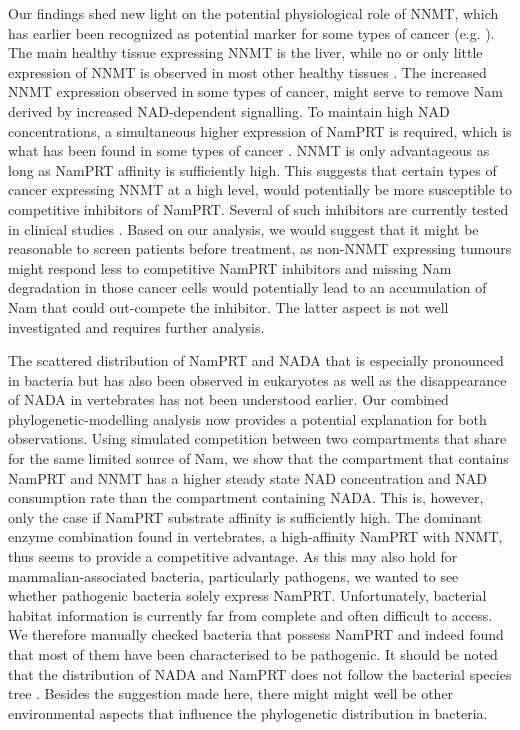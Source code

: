 Our findings shed new light on the potential physiological role of NNMT, which has earlier been recognized as potential marker for some types of cancer (e.g. \cite{Okamura1998}). The main healthy tissue expressing NNMT is the liver, while no or only little expression of NNMT is observed in most other healthy tissues . The increased NNMT expression observed in some types of cancer, might serve to remove Nam derived by increased NAD-dependent signalling. To maintain high NAD concentrations, a simultaneous higher expression of NamPRT is required, which is what has been found in some types of cancer \cite{Bi2011,Wang2011}. NNMT is only advantageous as long as NamPRT affinity is sufficiently high. This suggests that certain types of cancer expressing NNMT at a high level, would potentially be more susceptible to competitive inhibitors of NamPRT. Several of such inhibitors are currently tested in clinical studies \cite{Espindola-Netto2017} . Based on our analysis, we would suggest that it might be reasonable to screen patients before treatment, as non-NNMT expressing tumours might respond less to competitive NamPRT inhibitors and missing Nam degradation in those cancer cells would potentially lead to an accumulation of Nam that could out-compete the inhibitor. The latter aspect is not well investigated and requires further analysis.

The scattered distribution of NamPRT and NADA that is especially pronounced in bacteria \cite{Gazzaniga2009} but has also been observed in eukaryotes as well as the disappearance of NADA in vertebrates has not been understood earlier. Our combined phylogenetic-modelling analysis now provides a potential explanation for both observations. Using simulated competition between two compartments that share for the same limited source of Nam, we show that the compartment that contains NamPRT and NNMT has a higher steady state NAD concentration and NAD consumption rate than the compartment containing NADA. This is, however, only  the case if NamPRT substrate affinity is sufficiently high. The dominant enzyme combination found in vertebrates, a high-affinity NamPRT with NNMT, thus seems to provide a competitive advantage. As this may also hold for mammalian-associated bacteria, particularly pathogens, we wanted to see whether pathogenic bacteria solely express NamPRT. Unfortunately, bacterial habitat information is currently far from complete and often difficult to access. We therefore manually checked bacteria that possess NamPRT and indeed found that most of them have been characterised to be pathogenic. It should be noted that the distribution of NADA and NamPRT does not follow the bacterial species tree \cite{Gazzaniga2009}. Besides the suggestion made here, there might might well be other environmental aspects that influence the phylogenetic distribution in bacteria.

